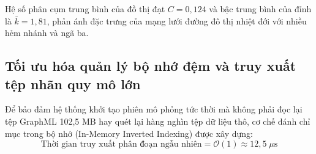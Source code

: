 \begin{table}[H]
\centering
\caption{Phân bố các phân cấp đường bộ và đặc tính vận tốc trong đồ thị mạng đường HCM}
\label{tab:osm-road-hierarchy}
\end{table}

Hệ số phân cụm trung bình của đồ thị đạt $C = 0{,}124$ và bậc trung bình của đỉnh là $\bar{k} = 1{,}81$, phản ánh đặc trưng của mạng lưới đường đô thị nhiệt đới với nhiều hẻm nhánh và ngã ba.

\subsection{Tối ưu hóa quản lý bộ nhớ đệm và truy xuất tệp nhãn quy mô lớn}

\hspace{0.5cm} Để bảo đảm hệ thống khởi tạo phiên mô phỏng tức thời mà không phải đọc lại tệp GraphML 102,5 MB hay quét lại hàng nghìn tệp dữ liệu thô, cơ chế đánh chỉ mục trong bộ nhớ (In-Memory Inverted Indexing) được xây dựng:
\begin{equation}
\text{Thời gian truy xuất phân đoạn ngẫu nhiên} = \mathcal{O}(1) \approx 12{,}5 \; \mu\text{s}
\label{eq:o1-lookup-time}
\end{equation}

\begin{table}[H]
\centering
\caption{Tài nguyên bộ nhớ và thời gian nạp dữ liệu của các bộ tải quỹ đạo thực nghiệm}
\label{tab:dataloader-benchmarks}
\end{table}

